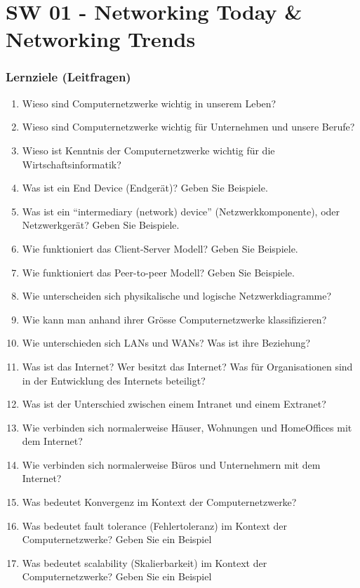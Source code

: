 \part{SW 01 - Networking Today \& Networking Trends}
\section{Lernziele (Leitfragen)}
\begin{enumerate}
    \item Wieso sind Computernetzwerke wichtig in unserem Leben?
    \item Wieso sind Computernetzwerke wichtig für Unternehmen und unsere Berufe?
    \item Wieso ist Kenntnis der Computernetzwerke wichtig für die Wirtschaftsinformatik?
    \item Was ist ein \flqq End Device\frqq{} (Endgerät)? Geben Sie Beispiele.
    \item Was ist ein ``intermediary (network) device'' (Netzwerkkomponente), oder Netzwerkgerät? Geben Sie Beispiele.
    \item Wie funktioniert das \flqq Client-Server\frqq{} Modell? Geben Sie Beispiele.
    \item Wie funktioniert das \flqq Peer-to-peer\frqq{} Modell? Geben Sie Beispiele.
    \item Wie unterscheiden sich physikalische und logische Netzwerkdiagramme?
    \item Wie kann man anhand ihrer Grösse Computernetzwerke klassifizieren?
    \item Wie unterschieden sich LANs und WANs? Was ist ihre Beziehung?
    \item Was ist das Internet? Wer besitzt das Internet? Was für Organisationen sind in der Entwicklung des Internets beteiligt?
    \item Was ist der Unterschied zwischen einem Intranet und einem Extranet?
    \item Wie verbinden sich normalerweise Häuser, Wohnungen und HomeOffices mit dem Internet?
    \item Wie verbinden sich normalerweise Büros und Unternehmern mit dem Internet?
    \item Was bedeutet Konvergenz im Kontext der Computernetzwerke?
    \item Was bedeutet \flqq fault tolerance\frqq{}  (Fehlertoleranz) im Kontext der Computernetzwerke? Geben Sie ein Beispiel
    \item Was bedeutet \flqq scalability\frqq{}  (Skalierbarkeit) im Kontext der Computernetzwerke? Geben Sie ein Beispiel

\end{enumerate}
